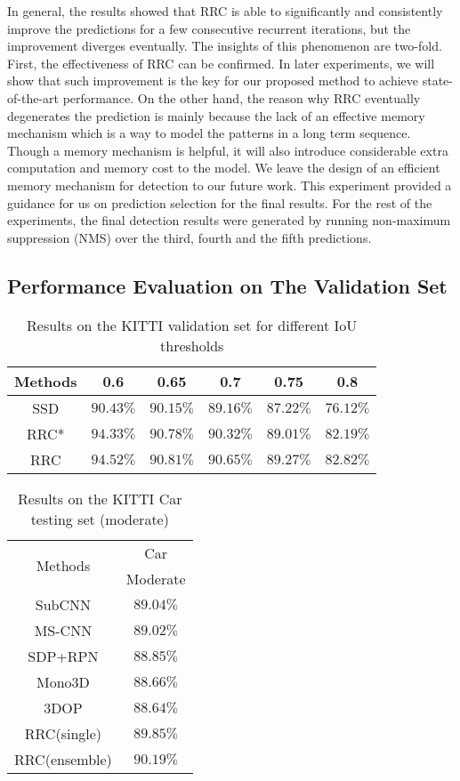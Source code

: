 \documentclass[10pt,twocolumn,letterpaper]{article}
\begin{document}
In general, the results showed that RRC is able to significantly and consistently improve the predictions for a few consecutive recurrent iterations, but the improvement diverges eventually. The insights of this phenomenon are two-fold. First, the effectiveness of RRC can be confirmed. In later experiments, we will show that such improvement is the key for our proposed method to achieve state-of-the-art performance. On the other hand, the reason why RRC eventually degenerates the prediction is mainly because the lack of an effective memory mechanism \cite{Hochreiter97} which is a way to model the patterns in a long term sequence. Though a memory mechanism is helpful, it will also introduce considerable extra computation and memory cost to the model. We leave the design of an efficient memory mechanism for detection to our future work. This experiment provided a guidance for us on prediction selection for the final results. For the rest of the experiments, the final detection results were generated by running non-maximum suppression (NMS) over the third, fourth and the fifth predictions.

\subsection{Performance Evaluation on The Validation Set}

\begin{table} \scriptsize
\centering
\caption{Results on the KITTI validation set for different IoU thresholds}
\label{table:ssd_compare}
\begin{tabular}{|c|c|c|c|c|c|}
\hline
\hline
Methods & 0.6 &0.65& 0.7 & 0.75&0.8 \\
\hline
SSD&$90.43\%$&$90.15\%$&$89.16\%$&$87.22\%$&$76.12\%$\\
RRC*&$94.33\%$&$90.78\%$&$90.32\%$&$89.01\%$&$82.19\%$\\
RRC&$94.52\%$&$90.81\%$&$90.65\%$&$89.27\%$&$82.82\%$\\
\hline
\end{tabular}
\end{table}



\begin{table}
\centering
\caption{Results on the KITTI Car testing set (moderate)}
\label{table:final_compare}
\begin{tabular}{|c||c|}
\hline
\hline
\multirow{2}{*}{Methods} & \multicolumn{1}{c|}{Car}  \\
 &Moderate\\
\hline
SubCNN \cite{Xiang16}&$89.04\%$\\
MS-CNN \cite{Cai16}&$89.02\%$\\
SDP+RPN \cite{Yang16}&$88.85\%$\\
Mono3D \cite{Chen16cvpr}&$88.66\%$\\
3DOP \cite{Chen15nips}&$88.64\%$\\
\hline
RRC(single)&$89.85\%$\\
RRC(ensemble)&$90.19\%$\\
\hline
\end{tabular}
\end{table}
\end{document}
